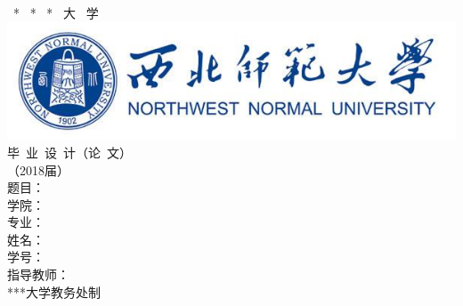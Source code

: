 \documentclass[a4paper]{ctexart}
\begin{document}
\pagestyle{empty}
\centering\vspace*{3ex}
	{\LARGE\lishu * \ * \ * \ * \ 大 \ 学}\vspace{4ex}\\
	\includegraphics[scale=.35]{xiaohui}\vspace{8ex}\\ 
	{ \heiti 毕\  业\ 设\ 计（论\ 文）}\vspace{3ex}\\ 
	{\Huge\heiti （2018届）}\\\vspace{8ex}
	{\Large
		{\heiti 题\phantom{题目}目：}\uline{}\medskip\\
		{\heiti 学\phantom{学院}院：}\uline{}\medskip\\
		{\heiti 专\phantom{专业}业：}\uline{}\medskip\\
		{\heiti 姓\phantom{姓名}名：}\uline{}\medskip\\
		{\heiti 学\phantom{学号}号：}\uline{}\medskip\\
		{\heiti 指导教师：}\uline{}\\\vspace{8ex}
		{\heiti ****大学教务处\phantom{空}制}
	}
\end{document}
